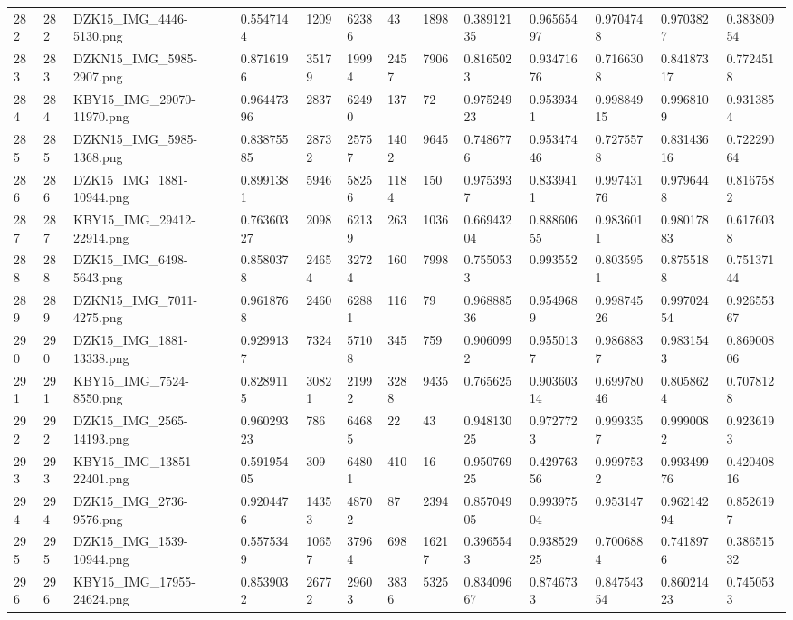 \documentclass[11pt, a4paper, twoside]{report}
\begin{document}
\begin{longtable}[c]{@{}lllllllllllll@{}}
282 & 282 & DZK15\_IMG\_4446-5130.png & 0.5547144 & 1209 & 62386 & 43 & 1898 & 0.38912135 & 0.96565497 & 0.9704748 & 0.9703827 & 0.38380954 \\
283 & 283 & DZKN15\_IMG\_5985-2907.png & 0.8716196 & 35179 & 19994 & 2457 & 7906 & 0.8165023 & 0.93471676 & 0.7166308 & 0.84187317 & 0.7724518 \\
284 & 284 & KBY15\_IMG\_29070-11970.png & 0.96447396 & 2837 & 62490 & 137 & 72 & 0.97524923 & 0.9539341 & 0.99884915 & 0.9968109 & 0.9313854 \\
285 & 285 & DZKN15\_IMG\_5985-1368.png & 0.83875585 & 28732 & 25757 & 1402 & 9645 & 0.7486776 & 0.95347446 & 0.7275578 & 0.83143616 & 0.72229064 \\
286 & 286 & DZK15\_IMG\_1881-10944.png & 0.8991381 & 5946 & 58256 & 1184 & 150 & 0.9753937 & 0.8339411 & 0.99743176 & 0.9796448 & 0.8167582 \\
287 & 287 & KBY15\_IMG\_29412-22914.png & 0.76360327 & 2098 & 62139 & 263 & 1036 & 0.66943204 & 0.88860655 & 0.9836011 & 0.98017883 & 0.6176038 \\
288 & 288 & DZK15\_IMG\_6498-5643.png & 0.8580378 & 24654 & 32724 & 160 & 7998 & 0.7550533 & 0.993552 & 0.8035951 & 0.8755188 & 0.75137144 \\
289 & 289 & DZKN15\_IMG\_7011-4275.png & 0.9618768 & 2460 & 62881 & 116 & 79 & 0.96888536 & 0.9549689 & 0.99874526 & 0.99702454 & 0.92655367 \\
290 & 290 & DZK15\_IMG\_1881-13338.png & 0.9299137 & 7324 & 57108 & 345 & 759 & 0.9060992 & 0.9550137 & 0.9868837 & 0.9831543 & 0.86900806 \\
291 & 291 & KBY15\_IMG\_7524-8550.png & 0.8289115 & 30821 & 21992 & 3288 & 9435 & 0.765625 & 0.90360314 & 0.69978046 & 0.8058624 & 0.7078128 \\
292 & 292 & DZK15\_IMG\_2565-14193.png & 0.96029323 & 786 & 64685 & 22 & 43 & 0.94813025 & 0.9727723 & 0.9993357 & 0.9990082 & 0.9236193 \\
293 & 293 & KBY15\_IMG\_13851-22401.png & 0.59195405 & 309 & 64801 & 410 & 16 & 0.95076925 & 0.42976356 & 0.9997532 & 0.99349976 & 0.42040816 \\
294 & 294 & DZK15\_IMG\_2736-9576.png & 0.9204476 & 14353 & 48702 & 87 & 2394 & 0.85704905 & 0.99397504 & 0.953147 & 0.96214294 & 0.8526197 \\
295 & 295 & DZK15\_IMG\_1539-10944.png & 0.5575349 & 10657 & 37964 & 698 & 16217 & 0.3965543 & 0.93852925 & 0.7006884 & 0.7418976 & 0.38651532 \\
296 & 296 & KBY15\_IMG\_17955-24624.png & 0.8539032 & 26772 & 29603 & 3836 & 5325 & 0.83409667 & 0.8746733 & 0.84754354 & 0.86021423 & 0.7450533 \\

\end{longtable}
\end{document}
